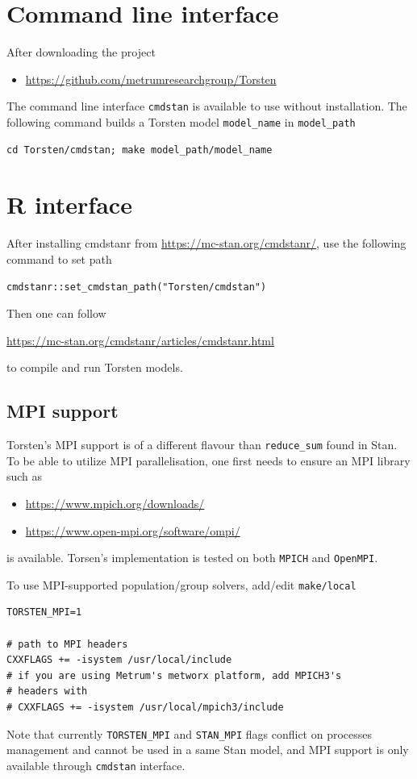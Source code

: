 \documentclass[10pt, reqno, oneside]{amsbook}
\numberwithin{equation}{chapter}
\numberwithin{figure}{chapter}
\numberwithin{table}{chapter}
\theoremstyle{remark}
\begin{document}
\section{Command line interface}
\label{sec:org9816887}
After downloading the project 

\begin{itemize}
\item \url{https://github.com/metrumresearchgroup/Torsten}
\end{itemize}

The command line interface \texttt{cmdstan} is available to use without
installation. The following command
builds a Torsten model \texttt{model\_name} in \texttt{model\_path}
\begin{verbatim}
cd Torsten/cmdstan; make model_path/model_name
\end{verbatim}

\section{R interface}
\label{sec:org01f3408}
After installing cmdstanr from \url{https://mc-stan.org/cmdstanr/}, use the
following command to set path 
\begin{verbatim}
cmdstanr::set_cmdstan_path("Torsten/cmdstan")
\end{verbatim}
Then one can follow 

\url{https://mc-stan.org/cmdstanr/articles/cmdstanr.html}

to compile and run Torsten models.

\subsection{MPI support}
\label{sec:orgc8e8631}
Torsten's MPI support is of a different flavour than
\texttt{reduce\_sum} found in Stan. To be able to utilize MPI
parallelisation, one first needs to ensure an MPI library
such as 
\begin{itemize}
\item \url{https://www.mpich.org/downloads/}
\item \url{https://www.open-mpi.org/software/ompi/}
\end{itemize}
is available. Torsen's implementation is tested on
both \texttt{MPICH} and \texttt{OpenMPI}.

To use MPI-supported population/group solvers,
add/edit \texttt{make/local}
\begin{verbatim}
TORSTEN_MPI=1

# path to MPI headers
CXXFLAGS += -isystem /usr/local/include
# if you are using Metrum's metworx platform, add MPICH3's
# headers with
# CXXFLAGS += -isystem /usr/local/mpich3/include
\end{verbatim}
Note that currently \texttt{TORSTEN\_MPI} and \texttt{STAN\_MPI} flags
conflict on processes management and cannot be used in a
same Stan model, and MPI support is only available through \texttt{cmdstan}
interface.
\end{document}

